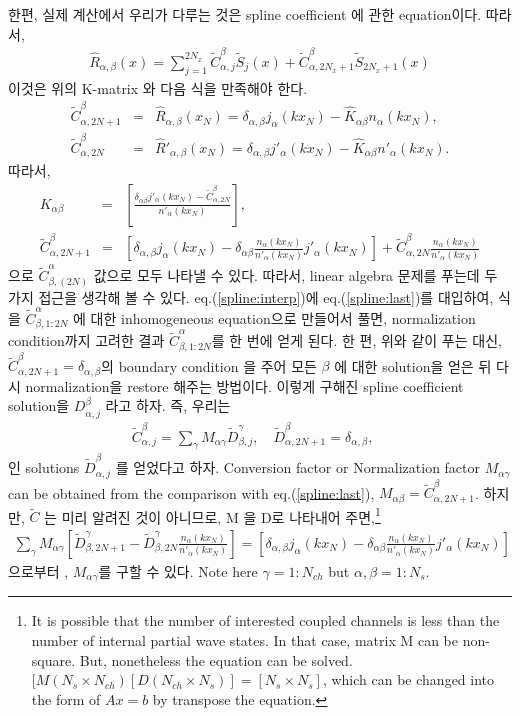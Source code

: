 \documentclass[10pt]{article}
\newcommand{\bea}{\begin{eqnarray}}
\newcommand{\eea}{\end{eqnarray}}
\newcommand{\no}{\nonumber \\}
\begin{document}
한편, 실제 계산에서 우리가 다루는 것은 spline coefficient 에 관한 equation이다. 따라서, 
\bea 
\hat{R}_{\alpha,\beta}(x)=\sum_{j=1}^{2N_x} \tilde{C}^{\beta}_{\alpha,j} \tilde{S}_j(x)
                           +\tilde{C}^{\beta}_{\alpha,2N_x+1} \tilde{S}_{2N_x+1}(x)
\eea 
이것은 위의 K-matrix 와 다음 식을 만족해야 한다. 
\bea 
\tilde{C}^{\beta}_{\alpha,2N+1}&=& \hat{R}_{\alpha,\beta}(x_N)
                                 =\delta_{\alpha,\beta} j_{\alpha}(kx_N)
                                 -\hat{K}_{\alpha\beta} n_{\alpha}(kx_N),\no  
\tilde{C}^{\beta}_{\alpha,2N}&=& \hat{R}'_{\alpha,\beta}(x_N)
                                 =\delta_{\alpha,\beta} j'_{\alpha}(kx_N)
                                 -\hat{K}_{\alpha\beta} n'_{\alpha}(kx_N).
\eea 
따라서, 
\bea 
\label{spline:last}
K_{\alpha\beta}&=&\left[
    \frac{\delta_{\alpha\beta}j'_\alpha(kx_N)-\tilde{C}^{\beta}_{\alpha,2N}}
    {n'_\alpha(kx_N)}      \right],
\no 
\tilde{C}^{\beta}_{\alpha,2N+1}&=&
 \left[\delta_{\alpha,\beta} j_{\alpha}(kx_N)
       -\delta_{\alpha\beta}\frac{n_\alpha(kx_N)}{n'_\alpha(kx_N)} j'_{\alpha}(kx_N)\right] 
   +\tilde{C}^\beta_{\alpha,2N} \frac{n_\alpha(kx_N)}{n'_\alpha(kx_N)}    
\eea 
으로 $\tilde{C}^\alpha_{\beta,(2N)}$ 값으로 모두 나타낼 수 있다. 따라서, linear algebra 문제를 
푸는데 두 가지 접근을 생각해 볼 수 있다. eq.(\ref{spline:interp})에 eq.(\ref{spline:last})를 
대입하여, 식을 $\tilde{C}^\alpha_{\beta,1:2N}$ 에 대한 inhomogeneous equation으로 만들어서 
풀면, normalization condition까지 고려한 결과 $\tilde{C}^\alpha_{\beta,1:2N}$를 한 번에 
얻게 된다. 한 편, 위와 같이 푸는 대신, 
$\tilde{C}^\beta_{\alpha,2N+1}=\delta_{\alpha,\beta}$의 boundary condition 을 주어 
모든 $\beta$ 에 대한 solution을 얻은 뒤 다시 normalization을 restore 해주는 방법이다. 
이렇게 구해진 spline coefficient solution을 $D^\beta_{\alpha,j}$ 라고 하자. 
즉, 우리는 
\bea 
\label{spline:CD}
\tilde{C}^\beta_{\alpha,j}=\sum_{\gamma} M_{\alpha\gamma}\tilde{D}^\gamma_{\beta,j}
,\quad 
\tilde{D}^\beta_{\alpha,2N+1}= \delta_{\alpha,\beta},
\quad 
\eea 
인 solutions $\tilde{D}^\beta_{\alpha,j}$ 를 얻었다고 하자. 
Conversion factor or Normalization factor $M_{\alpha\gamma}$ can be obtained from
the comparison with eq.(\ref{spline:last}), $M_{\alpha\beta}=\tilde{C}^\beta_{\alpha,2N+1}$.
하지만, $\tilde{C}$ 는 미리 알려진 것이 아니므로, M 을 D로 나타내어 주면,\footnote{
It is possible that the number of interested coupled channels is less than 
the number of internal partial wave states. In that case, matrix M can be non-square.
But, nonetheless the equation can be solved.
$ [M(N_s\times N_{ch}) [D(N_{ch}\times N_s)]=[N_s\times N_s]$, which can be 
changed into the form of $Ax=b$ by transpose the equation. 

}
\bea 
\label{spline:M}
\sum_{\gamma} M_{\alpha\gamma}\left[\tilde{D}^\gamma_{\beta,2N+1}-
                        \tilde{D}^\gamma_{\beta,2N}\frac{n_\alpha(kx_N)}{n'_\alpha(kx_N)}\right] 
 =\left[\delta_{\alpha,\beta} j_{\alpha}(kx_N)
        -\delta_{\alpha\beta}\frac{n_\alpha(kx_N)}{n'_\alpha(kx_N)} j'_{\alpha}(kx_N)\right]  
\eea  
으로부터 , $M_{\alpha\gamma}$를 구할 수 있다. Note here $\gamma=1:N_{ch}$ but $\alpha,\beta=1:N_s$.
\end{document}
